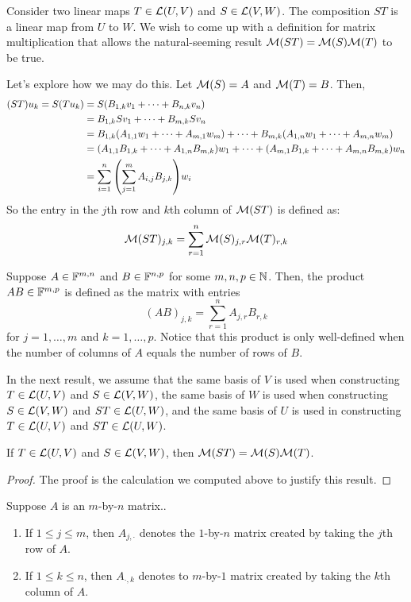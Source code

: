 Consider two linear maps $T\in\mathcal{L}(U,V)$ and $S\in\mathcal{L}(V,W)$. The composition $ST$ is a linear map from $U$ to $W$. We wish to come up with a definition for matrix multiplication that allows the natural-seeming result $\mathcal{M}(ST) = \mathcal{M}(S)\mathcal{M}(T)$ to be true. 

Let's explore how we may do this. Let $\mathcal{M}(S) = A$ and $\mathcal{M}(T) = B$. Then,
\begin{align*}
    (ST)u_k = S(Tu_k) &= S\pqty{B_{1,k}v_1 + \cdots + B_{n,k}v_n} \\
    &= B_{1,k}Sv_1 + \cdots + B_{m,k}Sv_n \\
    &= B_{1,k}\pqty{A_{1,1}w_1 + \cdots + A_{m,1}w_m} + \cdots + B_{m,k}\pqty{A_{1,n}w_1 + \cdots + A_{m,n}w_m} \\
    &= \pqty{A_{1,1}B_{1,k} + \cdots + A_{1,n}B_{m,k}}w_1 + \cdots + \pqty{A_{m,1}B_{1,k} + \cdots + A_{m,n}B_{m,k}}w_n \\
    &= \sum_{i=1}^n \pqty{\sum_{j=1}^m A_{i,j}B_{j,k}}w_i
\end{align*}
So the entry in the $j$th row and $k$th column of $\mathcal{M}(ST)$ is defined as:
\[ \mathcal{M}(ST)_{j,k} = \sum_{r=1}^n \mathcal{M}(S)_{j, r}\mathcal{M}(T)_{r,k} \]
\begin{definition}
    Suppose $A\in\mathbb F^{m,n}$ and $B\in\mathbb F^{n,p}$ for some $m,n,p\in\mathbb{N}$. Then, the product $AB\in \mathbb F^{m,p}$ is defined as the matrix with entries
    \[ (AB)_{j,k} = \sum_{r=1}^n A_{j,r}B_{r,k} \]
    for $j = 1, \dots, m$ and $k = 1, \dots, p$. Notice that this product is only well-defined when the number of columns of $A$ equals the number of rows of $B$.
\end{definition}
In the next result, we assume that the same basis of $V$ is used when constructing $T\in \mathcal{L}(U,V)$ and $S\in\mathcal{L}(V,W)$, the same basis of $W$ is used when constructing $S\in\mathcal{L}(V,W)$ and $ST\in\mathcal{L}(U,W)$, and the same basis of $U$ is used in constructing $T\in\mathcal{L}(U,V)$ and $ST\in\mathcal{L}(U,W)$.
\begin{theorem}
    If $T\in\mathcal{L}(U,V)$ and $S\in\mathcal{L}(V,W)$, then $\mathcal{M}(ST) = \mathcal{M}(S)\mathcal{M}(T)$.
\end{theorem}
\begin{proof}
    The proof is the calculation we computed above to justify this result.
\end{proof}
\begin{definition}
    Suppose $A$ is an $m$-by-$n$ matrix..
    \begin{enumerate}
        \item If $1 \le j \le m$, then $A_{j,\cdot}$ denotes the $1$-by-$n$ matrix created by taking the $j$th row of $A$. \item If $1 \le k \le n$, then $A_{\cdot, k}$ denotes to $m$-by-$1$ matrix created by taking the $k$th column of $A$. 
    \end{enumerate}
\end{definition}
